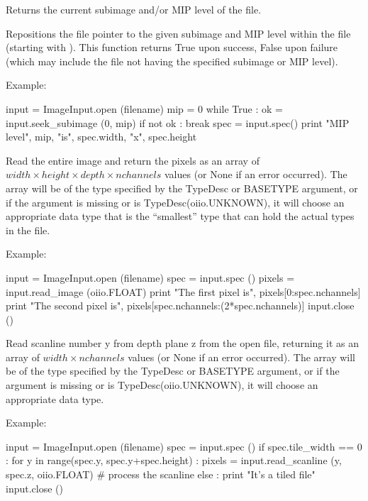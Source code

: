 Returns the current subimage and/or MIP level of the file.
\apiend

Repositions the file pointer to the given subimage and MIP level within the
file (starting with {}).  This function returns {\cf True} upon success,
{\cf False} upon failure (which may include the file not having the
specified subimage or MIP level).

\noindent Example:
\begin{code}
    input = ImageInput.open (filename)
    mip = 0
    while True :
        ok = input.seek_subimage (0, mip)
        if not ok :
            break
        spec = input.spec()
        print "MIP level", mip, "is", spec.width, "x", spec.height
\end{code}
\apiend

Read the entire image and return the pixels as an array of
$\mathit{width} \times \mathit{height} \times \mathit{depth} \times \mathit{nchannels}$
values (or {\cf None} if an error occurred).  The array will be of the type
specified by the {\cf TypeDesc} or {\cf BASETYPE} argument, or  if the
argument is missing or is {\cf TypeDesc(oiio.UNKNOWN)}, it will choose an
appropriate data type that is the ``smallest'' type that can hold the actual
types in the file.

\noindent Example:
\begin{code}
    input = ImageInput.open (filename)
    spec = input.spec ()
    pixels = input.read_image (oiio.FLOAT)
    print "The first pixel is", pixels[0:spec.nchannels]
    print "The second pixel is", pixels[spec.nchannels:(2*spec.nchannels)]
    input.close ()
\end{code}
\apiend

Read scanline number {\cf y} from depth plane {\cf z} from the open file,
returning it as an array of $\mathit{width} \times \mathit{nchannels}$
values (or {\cf None} if an error occurred). The array will be of the type
specified by the {\cf TypeDesc} or {\cf BASETYPE} argument, or if the
argument is missing or is {\cf TypeDesc(oiio.UNKNOWN)}, it will choose an
appropriate data type.

\noindent Example:
\begin{code}
    input = ImageInput.open (filename)
    spec = input.spec ()
    if spec.tile_width == 0 :
        for y in range(spec.y, spec.y+spec.height) :
            pixels = input.read_scanline (y, spec.z, oiio.FLOAT)
            # process the scanline
    else :
        print "It's a tiled file"
    input.close ()
\end{code}
\apiend


